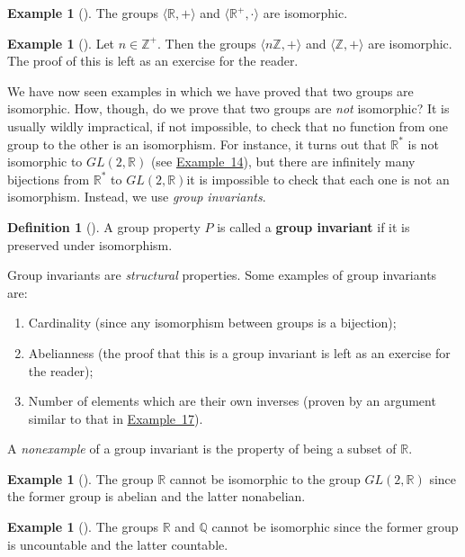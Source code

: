 \documentclass[10pt,]{book}
\newcommand{\terminology}[1]{\textbf{#1}}
\theoremstyle{plain}
\theoremstyle{definition}
\newtheorem{definition}[theorem]{Definition}
\theoremstyle{definition}
\theoremstyle{definition}
\newtheorem{example}[theorem]{Example}
\theoremstyle{definition}
\numberwithin{equation}{section}
\def\Z{\mathbb{Z}}
\def\R{\mathbb{R}}
\def\Q{\mathbb{Q}}
\begin{document}
\begin{example}[]\label{example-27}
The groups \(\langle \R,+\rangle\) and \(\langle \R^+, \cdot\rangle\) are isomorphic.%
\end{example}
\begin{example}[]\label{example-28}
Let \(n\in \Z^+\). Then the groups \(\langle n\Z,+\rangle\) and \(\langle \Z,+\rangle\) are isomorphic. The proof of this is left as an exercise for the reader.%
\end{example}
We have now seen examples in which we have proved that two groups are isomorphic. How, though, do we prove that two groups are \emph{not} isomorphic? It is usually wildly impractical, if not impossible, to check that no function from one group to the other is an isomorphism. For instance, it turns out that \(\R^*\) is not isomorphic to \(GL(2,\R)\) (see \hyperref[rgl]{Example~14}), but there are infinitely many bijections from \(\R^*\) to \(GL(2,\R)\)\textemdash{}it is impossible to check that each one is not an isomorphism. Instead, we use \emph{group invariants}.%
\begin{definition}[{}]\label{definition-35}
A group property \(P\) is called a \terminology{group invariant} if it is preserved under isomorphism.%
\end{definition}
Group invariants are \emph{structural} properties. Some examples of group invariants are: \leavevmode%
\begin{enumerate}
\item\hypertarget{li-154}{}Cardinality (since any isomorphism between groups is a bijection);%
\item\hypertarget{li-155}{}Abelianness (the proof that this is a group invariant is left as an exercise for the reader);%
\item\hypertarget{li-156}{}Number of elements which are their own inverses (proven by an argument similar to that in \hyperref[x4nonunique]{Example~17}).%
\end{enumerate}
%
\par
A \emph{nonexample} of a group invariant is the property of being a subset of \(\R\).%
\begin{example}[]\label{rgl}
The group \(\R\) cannot be isomorphic to the group \(GL(2,\R)\) since the former group is abelian and the latter nonabelian.%
\end{example}
\begin{example}[]\label{example-30}
The groups \(\R\) and \(\Q\) cannot be isomorphic since the former group is uncountable and the latter countable.%
\end{example}
\end{document}
